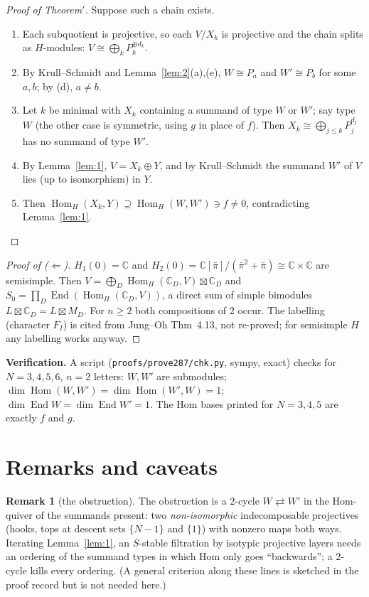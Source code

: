 \documentclass[11pt]{amsart}
\newcommand{\pib}{\bar\pi}
\newcommand{\Hom}{\operatorname{Hom}}
\newcommand{\End}{\operatorname{End}}
\newcommand{\C}{\mathbb{C}}
\theoremstyle{plain}
\theoremstyle{definition}
\newtheorem{remark}[theorem]{Remark}
\begin{document}
\begin{proof}[Proof of Theorem$'$]
Suppose such a chain exists.
\begin{enumerate}[itemsep=1pt]
\item Each subquotient is projective, so each $V/X_k$ is projective and the chain splits as $H$-modules: $V\cong\bigoplus_kP_k^{\oplus d_k}$.
\item By Krull--Schmidt and Lemma~\ref{lem:2}(a),(e), $W\cong P_a$ and $W'\cong P_b$ for some $a,b$; by (d), $a\ne b$.
\item Let $k$ be minimal with $X_k$ containing a summand of type $W$ or $W'$; say type $W$ (the other case is symmetric, using $g$ in place of $f$). Then $X_k\cong\bigoplus_{j\le k}P_j^{d_j}$ has no summand of type $W'$.
\item By Lemma~\ref{lem:1}, $V=X_k\oplus Y$, and by Krull--Schmidt the summand $W'$ of $V$ lies (up to isomorphism) in $Y$.
\item Then $\Hom_H(X_k,Y)\supseteq\Hom_H(W,W')\ni f\ne0$, contradicting Lemma~\ref{lem:1}. \qedhere
\end{enumerate}
\end{proof}

\begin{proof}[Proof of ($\Leftarrow$)]
$H_1(0)=\C$ and $H_2(0)=\C[\pib]/(\pib^2+\pib)\cong\C\times\C$ are semisimple. Then $V=\bigoplus_D\Hom_H(\C_D,V)\boxtimes\C_D$ and $S_0=\prod_D\End(\Hom_H(\C_D,V))$, a direct sum of simple bimodules $L\boxtimes\C_D=L\boxtimes M_D$. For $n\ge2$ both compositions of $2$ occur. The labelling (character $F_I$) is cited from Jung--Oh Thm~4.13, not re-proved; for semisimple $H$ any labelling works anyway.
\end{proof}

\noindent\textbf{Verification.} A script (\texttt{proofs/prove287/chk.py}, sympy, exact) checks for $N=3,4,5,6$, $n=2$ letters: $W,W'$ are submodules; $\dim\Hom(W,W')=\dim\Hom(W',W)=1$; $\dim\End W=\dim\End W'=1$. The Hom bases printed for $N=3,4,5$ are exactly $f$ and $g$.

\section{Remarks and caveats}

\begin{remark}[the obstruction]
The obstruction is a $2$-cycle $W\rightleftarrows W'$ in the Hom-quiver of the summands present: two \emph{non-isomorphic} indecomposable projectives (hooks, tops at descent sets $\{N-1\}$ and $\{1\}$) with nonzero maps both ways. Iterating Lemma~\ref{lem:1}, an $S$-stable filtration by isotypic projective layers needs an ordering of the summand types in which Hom only goes ``backwards''; a $2$-cycle kills every ordering. (A general criterion along these lines is sketched in the proof record but is not needed here.)
\end{remark}
\end{document}
